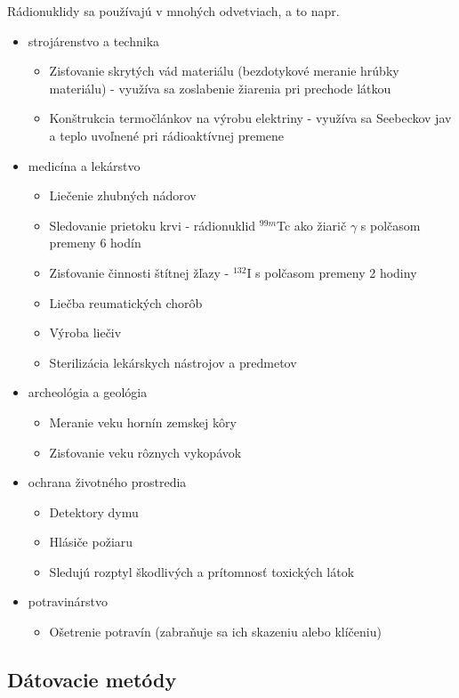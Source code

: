 \documentclass[../../main.tex]{subfiles}
\begin{document}
Rádionuklidy sa používajú v mnohých odvetviach, a to napr.
\begin{itemize}
\item strojárenstvo a technika
\begin{itemize}
\item Zisťovanie skrytých vád materiálu (bezdotykové meranie hrúbky materiálu) - využíva sa zoslabenie žiarenia pri prechode látkou
\item Konštrukcia termočlánkov na výrobu elektriny - využíva sa Seebeckov jav a teplo uvoľnené pri rádioaktívnej premene
\end{itemize}
\item medicína a lekárstvo
\begin{itemize}
\item Liečenie zhubných nádorov
\item Sledovanie prietoku krvi - rádionuklid $^{99m}$Tc ako žiarič $\gamma$ s polčasom premeny 6 hodín
\item Zisťovanie činnosti štítnej žľazy - $^{132}$I s polčasom premeny 2 hodiny
\item Liečba reumatických chorôb
\item Výroba liečiv
\item Sterilizácia lekárskych nástrojov a predmetov
\end{itemize}
\item archeológia a geológia
\begin{itemize}
\item Meranie veku hornín zemskej kôry
\item Zisťovanie veku rôznych vykopávok
\end{itemize}
\item ochrana životného prostredia
\begin{itemize}
\item Detektory dymu
\item Hlásiče požiaru
\item Sledujú rozptyl škodlivých a prítomnosť toxických látok
\end{itemize}
\item potravinárstvo
\begin{itemize}
\item Ošetrenie potravín (zabraňuje sa ich skazeniu alebo klíčeniu)
\end{itemize}
\end{itemize}

\subsection{Dátovacie metódy}
\end{document}
